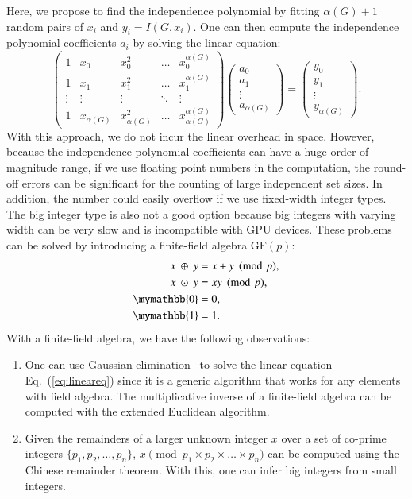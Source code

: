 \documentclass[onefignum, onetabnum]{siamart190516}
\newcommand{\<}{\langle}
\renewcommand{\>}{\rangle}
\newcommand{\Eq}[1]{Eq.~(\ref{#1})}
\begin{document}
Here, we propose to find the independence polynomial by fitting $\alpha(G)+1$ random pairs of $x_{i}$ and $y_{i} = I(G,x_{i})$. One can then compute the independence polynomial coefficients $a_{i}$ by solving the linear equation: 
\begin{equation}
\left(\begin{matrix}
1 & x_0 & x_0^2 & \ldots & x_0^{\alpha(G)} \\
1 & x_1 & x_1^2 & \ldots & x_1^{\alpha(G)} \\
\vdots & \vdots & \vdots &\ddots & \vdots \\
1 & x_{\alpha(G)} & x_{\alpha(G)}^2 & \ldots & x_{\alpha(G)}^{\alpha(G)}
\end{matrix}\right)
\left(\begin{matrix}
a_0 \\ a_1 \\ \vdots \\ a_{\alpha(G)}
\end{matrix}\right)
= \left(\begin{matrix}
y_0 \\ y_1 \\ \vdots \\ y_{\alpha(G)}
\end{matrix}\right).\label{eq:lineareq}
\end{equation}
With this approach, we do not incur the linear overhead in space. However, because the independence polynomial coefficients can have a huge order-of-magnitude range, if we use floating point numbers in the computation, the round-off errors can be significant for the counting of large independent set sizes.
In addition, the number could easily overflow if we use fixed-width integer types.
The big integer type is also not a good option because big integers with varying width can be very slow and is incompatible with GPU devices. These problems can be solved by introducing a finite-field algebra $\text{GF}(p)$:
\begin{equation}
\begin{split}
    x ~\oplus~ y &= x+y\pmod p,\\
    x ~\odot~ y &= xy\pmod p,\\
    \mymathbb{0} &= 0,\\
    \mymathbb{1} &= 1.
\end{split}\label{eq:finitefield}
\end{equation}
With a finite-field algebra, we have the following observations:
\begin{enumerate}
    \item One can use Gaussian elimination~\cite{Golub2013} to solve the linear equation \Eq{eq:lineareq} since it is a generic algorithm that works for any elements with field algebra. The multiplicative inverse of a finite-field algebra can be computed with the extended Euclidean algorithm.
    \item Given the remainders of a larger unknown integer $x$ over a set of co-prime integers $\{p_1, p_2, \ldots, p_n\}$,
    $x \pmod {p_1 \times p_2 \times \ldots \times p_n}$ can be computed using the Chinese remainder theorem. With this, one can infer big integers from small integers.
\end{enumerate}
\end{document}
